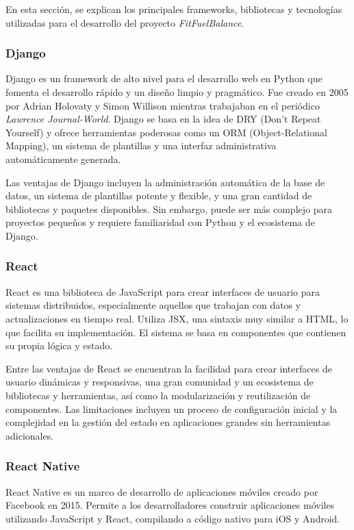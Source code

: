En esta sección, se explican los principales frameworks, bibliotecas y tecnologías utilizadas para el desarrollo del proyecto \textit{FitFuelBalance}.

\subsubsection{Django}

Django es un framework de alto nivel para el desarrollo web en Python que fomenta el desarrollo rápido y un diseño limpio y pragmático. Fue creado en 2005 por Adrian Holovaty y Simon Willison mientras trabajaban en el periódico \textit{Lawrence Journal-World}. Django se basa en la idea de DRY (Don’t Repeat Yourself) y ofrece herramientas poderosas como un ORM (Object-Relational Mapping), un sistema de plantillas y una interfaz administrativa automáticamente generada.

Las ventajas de Django incluyen la administración automática de la base de datos, un sistema de plantillas potente y flexible, y una gran cantidad de bibliotecas y paquetes disponibles. Sin embargo, puede ser más complejo para proyectos pequeños y requiere familiaridad con Python y el ecosistema de Django.

\subsubsection{React}

React es una biblioteca de JavaScript para crear interfaces de usuario para sistemas distribuidos, especialmente aquellos que trabajan con datos y actualizaciones en tiempo real. Utiliza JSX, una sintaxis muy similar a HTML, lo que facilita su implementación. El sistema se basa en componentes que contienen su propia lógica y estado.

Entre las ventajas de React se encuentran la facilidad para crear interfaces de usuario dinámicas y responsivas, una gran comunidad y un ecosistema de bibliotecas y herramientas, así como la modularización y reutilización de componentes. Las limitaciones incluyen un proceso de configuración inicial y la complejidad en la gestión del estado en aplicaciones grandes sin herramientas adicionales.

\subsubsection{React Native}

React Native es un marco de desarrollo de aplicaciones móviles creado por Facebook en 2015. Permite a los desarrolladores construir aplicaciones móviles utilizando JavaScript y React, compilando a código nativo para iOS y Android.

